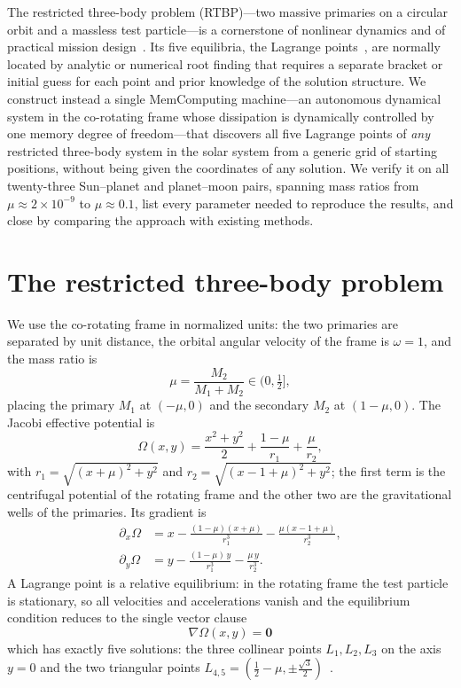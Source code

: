 \documentclass[aip,preprint,amsmath,amssymb,floatfix]{revtex4-2}
\begin{document}
The restricted three-body problem (RTBP)---two massive primaries on a circular
orbit and a massless test particle---is a cornerstone of nonlinear dynamics and
of practical mission design~\cite{szebehely1967}. Its five equilibria, the
Lagrange points~\cite{lagrange1772}, are normally located by analytic or
numerical root finding that requires a separate bracket or initial guess for each
point and prior knowledge of the solution structure. We construct instead a
single MemComputing machine---an autonomous dynamical system in the co-rotating
frame whose dissipation is dynamically controlled by one memory degree of
freedom---that discovers all five Lagrange points of \emph{any} restricted
three-body system in the solar system from a generic grid of starting positions,
without being given the coordinates of any solution. We verify it on all
twenty-three Sun--planet and planet--moon pairs, spanning mass ratios from
$\mu \approx 2\times10^{-9}$ to $\mu \approx 0.1$, list every parameter needed to
reproduce the results, and close by comparing the approach with existing methods.

\section{The restricted three-body problem}\label{sec:rtbp}

We use the co-rotating frame in normalized units: the two primaries are separated
by unit distance, the orbital angular velocity of the frame is $\omega=1$, and the
mass ratio is
\begin{equation}
  \mu = \frac{M_2}{M_1+M_2}\in(0,\tfrac12],
\end{equation}
placing the primary $M_1$ at $(-\mu,0)$ and the secondary $M_2$ at $(1-\mu,0)$.
The Jacobi effective potential is
\begin{equation}
  \Omega(x,y)=\frac{x^2+y^2}{2}+\frac{1-\mu}{r_1}+\frac{\mu}{r_2},
  \label{eq:omega}
\end{equation}
with $r_1=\sqrt{(x+\mu)^2+y^2}$ and $r_2=\sqrt{(x-1+\mu)^2+y^2}$; the first term
is the centrifugal potential of the rotating frame and the other two are the
gravitational wells of the primaries. Its gradient is
\begin{align}
  \partial_x\Omega &= x-\frac{(1-\mu)(x+\mu)}{r_1^3}-\frac{\mu(x-1+\mu)}{r_2^3},
  \label{eq:gx}\\
  \partial_y\Omega &= y-\frac{(1-\mu)\,y}{r_1^3}-\frac{\mu\,y}{r_2^3}.
  \label{eq:gy}
\end{align}
A Lagrange point is a relative equilibrium: in the rotating frame the test
particle is stationary, so all velocities and accelerations vanish and the
equilibrium condition reduces to the single vector clause
\begin{equation}
  \boxed{\;\nabla\Omega(x,y)=\mathbf 0\;}
  \label{eq:clause}
\end{equation}
which has exactly five solutions: the three collinear points $L_1,L_2,L_3$ on the
axis $y=0$ and the two triangular points
$L_{4,5}=(\tfrac12-\mu,\pm\tfrac{\sqrt3}{2})$~\cite{szebehely1967}.
\end{document}
